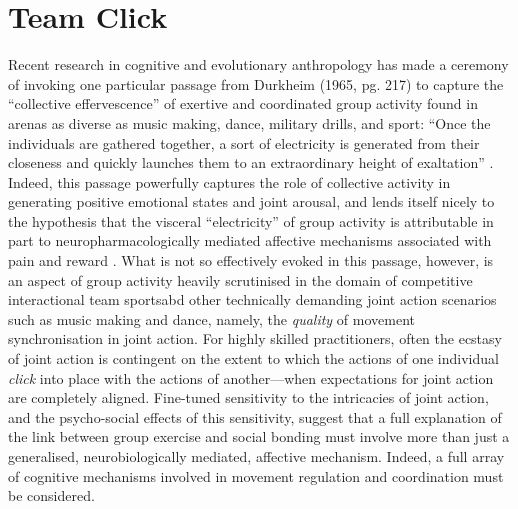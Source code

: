 \section{Team Click}
Recent research in cognitive and evolutionary anthropology has made a ceremony of invoking one particular passage from Durkheim (1965, pg. 217) to capture the ``collective effervescence'' of exertive and coordinated group activity found in arenas as diverse as music making, dance, military drills, and sport:  ``Once the individuals are gathered together, a sort of electricity is generated from their closeness and quickly launches them to an extraordinary height of exaltation'' \citep{McNeill1995,Konvalinka2011,Fischer2014,Mogan2017}. Indeed, this passage powerfully captures the role of collective activity in generating positive emotional states and joint arousal, and lends itself nicely to the hypothesis that the visceral ``electricity'' of group activity is attributable in part to neuropharmacologically mediated affective mechanisms associated with pain and reward \citep{Dunbar2008,Cohen2009,Fischer2014,Launay2016}.
What is not so effectively evoked in this passage, however, is an aspect of group activity heavily scrutinised in the domain of competitive interactional team sportsabd  other technically demanding joint action scenarios such as music making and dance, namely, the \textit{quality} of movement synchronisation in joint action.  For highly skilled practitioners, often the ecstasy of joint action is contingent on the extent to which the actions of one individual \textit{click} into place with the actions of another---when expectations for joint action are completely aligned.  Fine-tuned sensitivity to the intricacies of joint action, and the psycho-social effects of this sensitivity, suggest that a full explanation of the link between group exercise and social bonding must involve more than just a generalised, neurobiologically mediated, affective mechanism.  Indeed, a full array of cognitive mechanisms involved in movement regulation and coordination must be considered.

